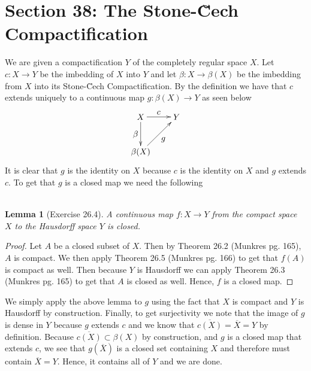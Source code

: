 \documentclass{article}
\newcommand{\exercise}[1]{\noindent{\textbf{Exercise #1:}}}
\newtheorem*{lem}{\\ Lemma}
\begin{document}
\section{Section 38: The Stone-\u{C}ech Compactification}

\exercise{38.4}

We are given a compactification $Y$ of the completely
regular space $X$. Let $c: X \to Y$ be the imbedding of $X$ into $Y$ and
let $\beta: X \to \beta(X)$ be the imbedding from $X$ into its Stone-\u{C}ech
Compactification. By the definition we have that $c$ extends uniquely
to a continuous map $g: \beta(X) \to Y$ as seen below
\[
\begin{xy}
(0,0)*+{\beta(X)}="BETAX"; (15,15)*+{Y}="Y"; (0,15)*+{X}="X";
{\ar_{\mathlarger{\beta}} "X";"BETAX"};
{\ar^{\mathlarger{c}} "X";"Y"};
{\ar_{\mathlarger{g}} "BETAX";"Y"};
\end{xy}
\]
It is clear that $g$ is the identity on $X$ because $c$ is the
identity on $X$ and $g$ extends $c$. To get that $g$ is a closed map
we need the following

\begin{lem}[Exercise 26.4]
  A continuous map $f: X \to Y$ from the compact space $X$ to the
  Hausdorff space $Y$ is closed.
\end{lem}
\begin{proof}
  Let $A$ be a closed subset of $X$. Then by Theorem 26.2 (Munkres
  pg. 165), $A$ is compact. We then apply Theorem 26.5 (Munkres
  pg. 166) to get that $f(A)$ is compact as well. Then because $Y$ is
  Hausdorff we can apply Theorem 26.3 (Munkres pg. 165) to get that
  $A$ is closed as well. Hence, $f$ is a closed map.
\end{proof}

We simply apply the above lemma to $g$ using the fact that $X$ is
compact and $Y$ is Hausdorff by construction. Finally, to get
surjectivity we note that the image of $g$ is dense in $Y$ because $g$
extends $c$ and we know that $\overline{c(X)} = \overline{X} = Y$ by
definition. Because $\overline{c(X)} \subset \beta(X)$ by
construction, and $g$ is a closed map that extends $c$, we see that
$g(\overline{X})$ is a closed set containing $X$ and therefore must
contain $\overline{X} = Y$. Hence, it contains all of $Y$ and we are
done.
\end{document}
